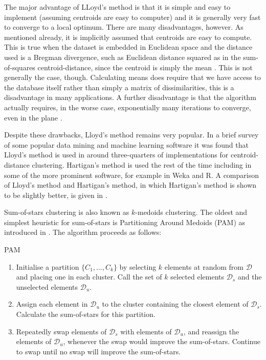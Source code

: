\documentclass[a4paper]{report}
\newcommand{\dset}{\mathcal{D}}
\begin{document}
The major advantage of LLoyd's method is that it is simple and easy to
implement (assuming centroids are easy to computer) and it is generally very
fast to converge to a local optimum.  There are many disadvantages, however.
As mentioned already, it is implicitly assumed that centroids are easy to
compute.  This is true when the dataset is embedded in Euclidean space and the
distance used is a Bregman divergence, such as Euclidean distance squared as
in the sum-of-squares centroid-distance, since the centroid is simply the mean
\citep{telgarsky2010hartigan,banerjee2005clustering}.  This is not generally
the case, though.  Calculating means does require that we have access to the
database itself rather than simply a matrix of dissimilarities, this is a
disadvantage in many applications.  A further disadvantage is that the
algorithm actually requires, in the worse case, exponentially many iterations
to converge, even in the plane \citep{vattani2009exponential}.

Despite these drawbacks, Lloyd's method remains very popular.  In a brief
survey of some popular data mining and machine learning software it was found
that Lloyd's method is used in around three-quarters of implementations for
centroid-distance clustering.  Hartigan's method is used the rest of the time
including in some of the more prominent software, for example in Weka and R.
A comparison of Lloyd's method and Hartigan's method, in which Hartigan's
method is shown to be slightly better, is given in
\citep{telgarsky2010hartigan}.

Sum-of-stars clustering is also known as $k$-medoids clustering.  The oldest
and simplest heuristic for sum-of-stars is Partitioning Around Medoids (PAM)
as introduced in \citet{kaufman2005finding}.  The algorithm proceeds as
follows:
\begin{algorithm}
  \caption{PAM}
  \begin{enumerate}
  \item Initialise a partition $\{C_1,\dotsc,C_k\}$ by selecting $k$ elements
    at random from $\dset$ and placing one in each cluster.  Call the set of
    $k$ selected elements $\dset_s$ and the unselected elements $\dset_u$.
  \item Assign each element in $\dset_u$ to the cluster containing the closest
    element of $\dset_s$.  Calculate the sum-of-stars for this partition.
  \item Repeatedly swap elements of $\dset_s$ with elements of $\dset_u$, and
    reassign the elements of $\dset_u$, whenever the swap would improve the
    sum-of-stars.  Continue to swap until no swap will improve the
    sum-of-stars.
  \end{enumerate}
\end{algorithm}
\end{document}
